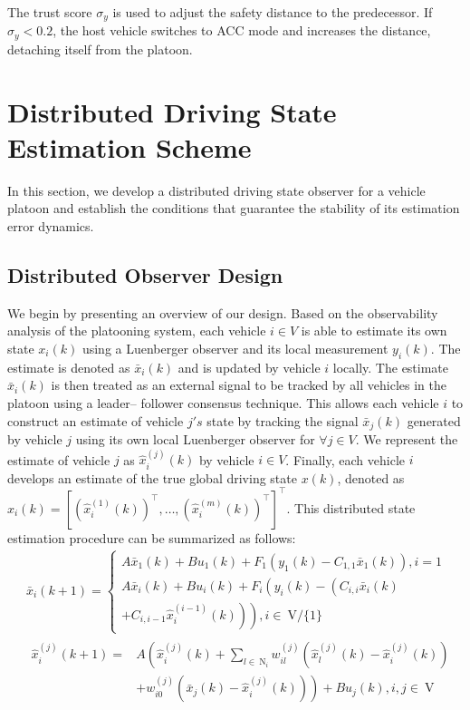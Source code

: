 \documentclass[letterpaper, 10pt, conference]{ieeeconf}  %
\begin{document}
The trust score $\sigma_y$ is used to adjust the safety distance to the predecessor. If $\sigma_y < 0.2$, the host vehicle switches to ACC mode and increases the distance, detaching itself from the platoon.

\section{Distributed Driving State Estimation Scheme}

In this section, we develop a distributed driving state observer
for a vehicle platoon and establish the conditions that guarantee
the stability of its estimation error dynamics.

\subsection{Distributed Observer Design}
We begin by presenting an overview of our design. Based
on the observability analysis of the platooning system, each
vehicle $i \in V$ is able to estimate its own state $x_i(k)$ using
a Luenberger observer and its local measurement $y_i(k)$. The
estimate is denoted as $\bar{x}_i(k)$ and is updated by vehicle $i$ 
locally. The estimate $\bar{x}_i(k)$ is then treated as an external signal
to be tracked by all vehicles in the platoon using a leader–
follower consensus technique. This allows each vehicle $i$ to
construct an estimate of vehicle $j's$ state by tracking the signal
$\bar{x}_j(k)$ generated by vehicle $j$ using its own local Luenberger
observer for $\forall j \in V$. We represent the estimate of vehicle $j$
as $\hat{x}_i^{(j)}(k)$ by vehicle $i \in V$. Finally, each vehicle $i$ develops
an estimate of the true global driving state $x(k)$, denoted as
$\hat{x}_i(k) = [(\hat{x}_i^{(1)}(k))^\top, \ldots, (\hat{x}_i^{(m)}(k))^\top]^\top$.
This distributed state estimation procedure can be summarized as follows:
\begin{equation}
\begin{aligned}
&\bar{x}_i(k+1)=\left\{\begin{array}{l}
A \bar{x}_1(k)+B u_1(k)+F_1\left(y_1(k)-C_{1,1} \bar{x}_1(k)\right), i=1 \\
A \bar{x}_i(k)+B u_i(k)+F_i\left(y_i(k)-\left(C_{i, i} \bar{x}_i(k)\right.\right. \\
\left.\left.+C_{i, i-1} \hat{x}_i^{(i-1)}(k)\right)\right), i \in \mathrm{~V} /\{1\}
\end{array}\right.\\
&\begin{aligned}
\hat{x}_i^{(j)}(k+1)= & A\left(\hat{x}_i^{(j)}(k)+\sum_{l \in \mathrm{~N}_i} w_{i l}^{(j)}\left(\hat{x}_l^{(j)}(k)-\hat{x}_i^{(j)}(k)\right)\right. \\
& \left.+w_{i 0}^{(j)}\left(\bar{x}_j(k)-\hat{x}_i^{(j)}(k)\right)\right)+B u_j(k), i, j \in \mathrm{~V}
\end{aligned}
\end{aligned}
\end{equation}
\end{document}
